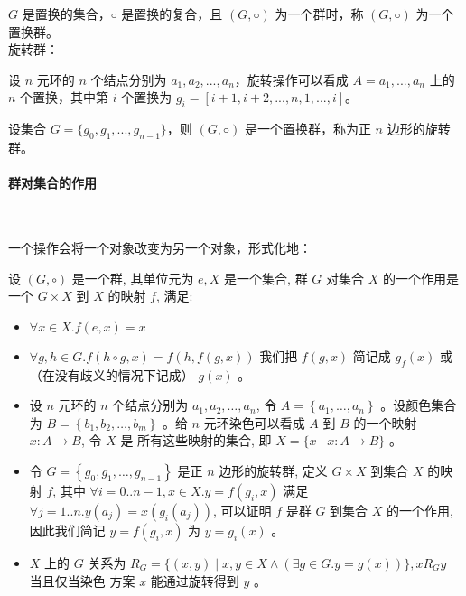 $G$ 是置换的集合，$◦$ 是置换的复合，且 $(G, ◦)$ 为一个群时，称 $(G, ◦)$ 为一个置换群。 \\


\noindent 旋转群：

设 $n$ 元环的 $n$ 个结点分别为 $a_1,a_2, ...,a_n$，旋转操作可以看成 $A = {a_1, ..., a_n}$ 上的 $n$ 个置换，其中第 $i$ 个置换为 $g_i = [i + 1,i + 2, ...,n,1, ...,i]$。 

设集合 $G= \{g_0,g_1, ...,g_{n−1}\}$，则 $(G,◦)$ 是一个置换群，称为正 $n$ 边形的旋转群。\\

\paragraph{群对集合的作用}\

一个操作会将一个对象改变为另一个对象，形式化地：

设 $(G, \circ)$ 是一个群, 其单位元为 $e, X$ 是一个集合, 群 $G$ 对集合 $X$ 的一个作用是一个 $G \times X$ 到 $X$ 的映射 $f$, 满足:

\begin{itemize}
    \item $\forall x \in X . f(e, x)=x$
    \item $\forall g, h \in G . f(h \circ g, x)=f(h, f(g, x))$
    我们把 $f(g, x)$ 简记成 $g_{f}(x)$ 或（在没有歧义的情况下记成） $g(x)$ 。
\end{itemize}

\begin{itemize}
    \item 设 $n$ 元环的 $n$ 个结点分别为 $a_{1}, a_{2}, \ldots, a_{n}$, 令 $A=\left\{a_{1}, \ldots, a_{n}\right\}$ 。设颜色集合为 $B=\left\{b_{1}, b_{2}, \ldots, b_{m}\right\}$ 。给 $n$ 元环染色可以看成 $A$ 到 $B$ 的一个映射 $x: A \rightarrow B$, 令 $X$ 是 所有这些映射的集合, 即 $X=\{x \mid x: A \rightarrow B\}$ 。
    \item 令 $G=\left\{g_{0}, g_{1}, \ldots, g_{n-1}\right\}$ 是正 $n$ 边形的旋转群, 定义 $G \times X$ 到集合 $X$ 的映射 $f$, 其中 $\forall i=0 . . n-1, x \in X . y=f\left(g_{i}, x\right)$ 满足 $\forall j=1 . . n . y\left(a_{j}\right)=x\left(g_{i}\left(a_{j}\right)\right)$, 可以证明 $f$ 是群 $G$ 到集合 $X$ 的一个作用, 因此我们简记 $y=f\left(g_{i}, x\right)$ 为 $y=g_{i}(x)$ 。
    \item $X$ 上的 $G$ 关系为 $R_{G}=\{(x, y) \mid x, y \in X \wedge(\exists g \in G . y=g(x))\}, x R_{G} y$ 当且仅当染色 方案 $x$ 能通过旋转得到 $y$ 。
\end{itemize}

